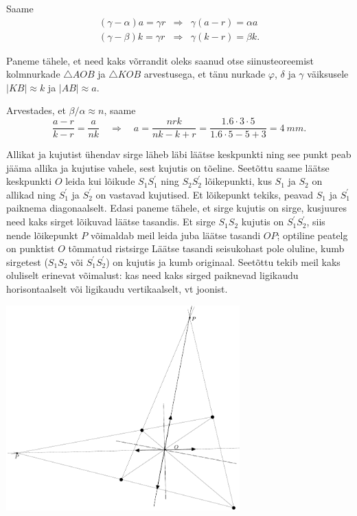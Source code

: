 \documentclass[10pt, twoside]{article}
\begin{document}
{Saame
\[
\begin{array}{lll}{(\gamma-\alpha) a=\gamma r} & {\Rightarrow} & {\gamma(a-r)=\alpha a} \\ {(\gamma-\beta) k=\gamma r} & {\Rightarrow} & {\gamma(k-r)=\beta k.}\end{array}
\]

Paneme tähele, et need kaks võrrandit oleks saanud otse siinusteoreemist kolmnurkade $\triangle AOB$ ja $\triangle KOB$ arvestusega, et tänu nurkade $\varphi$, $\delta$ ja $\gamma$ väiksusele $|KB| \approx k$ ja $|AB| \approx a$.

Arvestades, et $\beta /\alpha \approx n$, saame
\[
\frac{a-r}{k-r}=\frac{a}{n k} \quad \Rightarrow \quad a=\frac{n r k}{n k-k+r}=\frac{\num{1,6} \cdot \num{3} \cdot \num{5}}{\num{1,6} \cdot \num{5}-\num{5}+\num{3}}=\SI{4}{mm}.
\]
\probend
\bigskip


\solu
Allikat ja kujutist ühendav sirge läheb läbi läätse keskpunkti ning see punkt peab jääma allika ja kujutise vahele, sest kujutis on tõeline.
Seetõttu saame läätse keskpunkti $O$ leida kui lõikude $S_1S_1^\prime$ ning $S_2S_2^\prime$ lõikepunkti, kus $S_1$ ja $S_2$ on allikad ning $S_1^\prime$ ja $S_2^\prime$
on vastavad kujutised. Et lõikepunkt tekiks, peavad $S_1$ ja $S_1^\prime$ paiknema diagonaalselt. Edasi paneme tähele, et sirge kujutis on sirge, kusjuures
need kaks sirget lõikuvad läätse tasandis. Et sirge $S_1S_2$ kujutis on $S_1^\prime S_2^\prime$, siis nende lõikepunkt $P$ võimaldab meil leida juba
läätse tasandi $OP$; optiline peatelg on punktist $O$ tõmmatud ristsirge Läätse tasandi seisukohast pole oluline, kumb sirgetest ($S_1S_2$ või $S_1^\prime S_2^\prime$) on kujutis ja kumb originaal.
Seetõttu tekib meil kaks oluliselt erinevat võimalust: kas need kaks sirged paiknevad ligikaudu horisontaalselt või ligikaudu vertikaalselt, vt joonist.\\

\begin{center}
	\includegraphics[width=90mm]{2010-v3g-09-punktid_lah}
\end{center}
\probend
\bigskip

}
\end{document}

